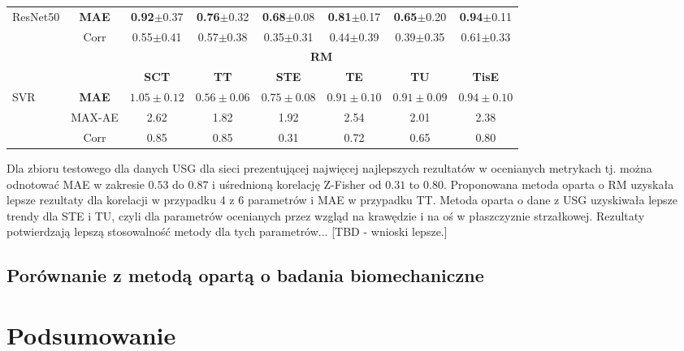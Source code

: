 \begin{table}[h]
\begin{tabular}{lc||c|c|c|c|c|c}
		ResNet50 & \textbf{MAE} & \textbf{0.92}$\pm$0.37 & \textbf{0.76}$\pm$0.32 & \textbf{0.68}$\pm$0.08 & \textbf{0.81}$\pm$0.17 & \textbf{0.65}$\pm$0.20 & \textbf{0.94}$\pm$0.11 \\
		& Corr & 0.55$\pm$0.41 & 0.57$\pm$0.38 & 0.35$\pm$0.31 & 0.44$\pm$0.39 & 0.39$\pm$0.35 & 0.61$\pm$0.33 \\ \hline \hline
				& & \multicolumn{6}{c}{\normalsize{\textbf{RM}}} \\
		& & \textbf{SCT} & \textbf{TT} & \textbf{STE} & \textbf{TE} & \textbf{TU} & \textbf{TisE}\\ \hline
		SVR & \textbf{MAE} & $1.05\pm0.12$ & $0.56\pm0.06$ & $0.75\pm0.08$ & $0.91\pm0.10$ & $0.91\pm0.09$ & $0.94\pm0.10$\\
		& MAX-AE & 2.62 & 1.82 & 1.92 & 2.54 & 2.01 & 2.38 \\
		& Corr   & 0.85 & 0.85 & 0.31 & 0.72 & 0.65 & 0.80 \\
		\hline \hline
	\end{tabular}
\end{table}

Dla zbioru testowego dla danych USG dla sieci prezentującej najwięcej najlepszych rezultatów w ocenianych metrykach tj. można odnotować MAE w zakresie $0.53$ do $0.87$ i uśrednioną korelację Z-Fisher od $0.31$ to $0.80$. Proponowana metoda oparta o RM uzyskała lepsze rezultaty dla korelacji w przypadku 4 z 6 parametrów i MAE w przypadku TT. Metoda oparta o dane z USG uzyskiwała lepsze trendy dla STE i TU, czyli dla parametrów ocenianych przez wzgląd na krawędzie i na oś w płaszczyznie strzałkowej. Rezultaty potwierdzają lepszą stosowalność metody dla tych parametrów... [TBD - wnioski lepsze.]

\section{Porównanie z metodą opartą o badania biomechaniczne}


\chapter{Podsumowanie}


